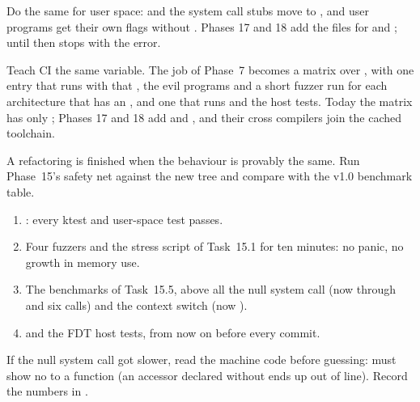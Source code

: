 \documentclass[11pt,a4paper]{article}
\begin{document}
Do the same for user space:  and the system call stubs move to , and user programs
get their own flags without . Phases 17 and 18 add the  files for 
and ; until then  stops with the error.

Teach CI the same variable. The job of Phase~7 becomes a matrix over , with one entry that runs
 with that , the evil programs and a short fuzzer run for each architecture that has an
, and one that runs  and the host tests. Today the matrix has only
; Phases 17 and 18 add  and , and their cross compilers join the cached
toolchain.

A refactoring is finished when the behaviour is provably the same. Run Phase~15's safety net against the new tree
and compare with the v1.0 benchmark table.

\begin{enumerate}
  \item {}: every ktest and user-space test passes.
  \item Four fuzzers and the stress script of Task~15.1 for ten minutes: no panic, no growth in memory use.
  \item The benchmarks of Task~15.5, above all the null system call (now through  and six
         calls) and the context switch (now ).
  \item {} and the FDT host tests, from now on before every commit.
\end{enumerate}

If the null system call got slower, read the machine code before guessing:
 must show no  to a  function (an
accessor declared without  ends up out of line). Record the numbers in .
\end{document}
